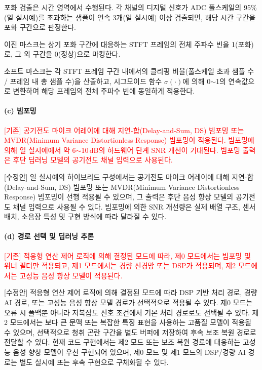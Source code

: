 \documentclass{article}
\newcommand{\reviewold}[1]{{\par\noindent\textcolor{red}{[기존] #1}}}
\newcommand{\reviewnew}[1]{{\par\noindent\textcolor{customblue}{[수정안] #1}}}
\newcommand{\reviewpair}[2]{\reviewold{#1}\reviewnew{#2}\par}
\begin{document}
포화 검출은 시간 영역에서 수행된다. 각 채널의 디지털 신호가 ADC 풀스케일의 95\%(일 실시예)를 초과하는 샘플이 연속 3개(일 실시예) 이상 검출되면, 해당 시간 구간을 포화 구간으로 판정한다.

이진 마스크는 상기 포화 구간에 대응하는 STFT 프레임의 전체 주파수 빈을 1(포화)로, 그 외 구간을 0(정상)으로 마킹한다.

소프트 마스크는 각 STFT 프레임 구간 내에서의 클리핑 비율(풀스케일 초과 샘플 수 / 프레임 내 총 샘플 수)을 산출하고, 시그모이드 함수 $\sigma(\cdot)$에 의해 0$\sim$1의 연속값으로 변환하여 해당 프레임의 전체 주파수 빈에 동일하게 적용한다.

\paragraph{(c) 빔포밍}

\reviewpair{공기전도 마이크 어레이에 대해 지연-합(Delay-and-Sum, DS) 빔포밍 또는 MVDR(Minimum Variance Distortionless Response) 빔포밍이 적용된다. 빔포밍에 의해 일 실시예에서 약 6$\sim$10\,dB의 하드웨어 단계 SNR 개선이 기대된다. 빔포밍 출력은 후단 딥러닝 모델의 공기전도 채널 입력으로 사용된다.}{일 실시예의 하이브리드 구성에서는 공기전도 마이크 어레이에 대해 지연-합(Delay-and-Sum, DS) 빔포밍 또는 MVDR(Minimum Variance Distortionless Response) 빔포밍이 선행 적용될 수 있으며, 그 출력은 후단 음성 향상 모델의 공기전도 채널 입력으로 사용될 수 있다. 빔포밍에 의한 SNR 개선량은 실제 배열 구조, 센서 배치, 소음장 특성 및 구현 방식에 따라 달라질 수 있다.}

\paragraph{(d) 경로 선택 및 딥러닝 추론}

\reviewpair{적응형 연산 제어 로직에 의해 결정된 모드에 따라, 제0 모드에서는 빔포밍 및 위너 필터만 적용되고, 제1 모드에서는 경량 신경망 또는 DSP가 적용되며, 제2 모드에서는 고성능 음성 향상 모델이 적용된다.}{적응형 연산 제어 로직에 의해 결정된 모드에 따라 DSP 기반 처리 경로, 경량 AI 경로, 또는 고성능 음성 향상 모델 경로가 선택적으로 적용될 수 있다. 제0 모드는 오류 시 폴백뿐 아니라 저복잡도 신호 조건에서 기본 처리 경로로도 선택될 수 있다. 제2 모드에서는 보다 큰 문맥 또는 복잡한 특징 표현을 사용하는 고품질 모델이 적용될 수 있으며, 선택적으로 청취 곤란 구간을 별도 버퍼에 저장하여 후속 보조 복원 경로로 전달할 수 있다. 현재 코드 구현에서는 제2 모드 또는 보조 복원 경로에 대응하는 고성능 음성 향상 모델이 우선 구현되어 있으며, 제0 모드 및 제1 모드의 DSP/경량 AI 경로는 별도 실시예 또는 후속 구현으로 구체화될 수 있다.}
\end{document}
